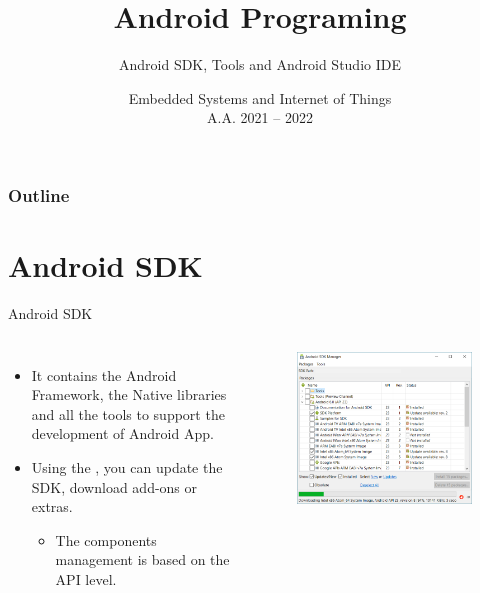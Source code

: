 \documentclass{beamer}
\title[Android -- 2A -- Tools]{Android Programing}
\subtitle{Android SDK, Tools and Android Studio IDE}
\date[ver. 1.0 (20220505)]{Embedded Systems and Internet of Things\\A.A. 2021 -- 2022}
\begin{document}
  \begin{frame}
    \titlepage
  \end{frame}

  

  \begin{frame}
    \frametitle{Outline}
    \tableofcontents
  \end{frame}

  \section{Android SDK}

  \begin{frame}{Android SDK}
    \begin{columns}[c]
        \begin{itemize}\itemsep12pt
          \item It contains the Android Framework, the Native libraries and all
          the tools to support the development of Android App. 
          \item Using the , you can update the SDK,
          download add-ons or extras. 
        \begin{itemize}
          \item The components management is based on the API level.
        \end{itemize}
        \end{itemize}
      \begin{figure}
      \includegraphics[width=1\linewidth]{figures/sdk-manager.png}
      \end{figure}
    \end{columns}
  \end{frame}
\end{document}
